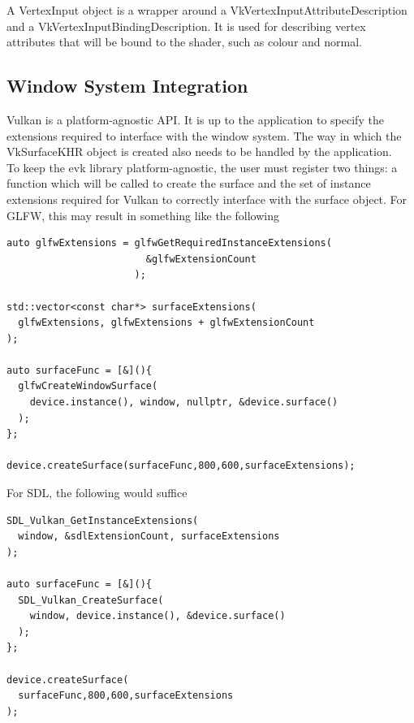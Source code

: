 \documentclass[12pt]{report}
\theoremstyle{definition}
\begin{document}
        A VertexInput object is a wrapper around a VkVertexInputAttributeDescription
        and a VkVertexInputBindingDescription. It is used for describing vertex
        attributes that will be bound to the shader, such as colour and normal.

      \subsection{Window System Integration}

        Vulkan is a platform-agnostic API. It is up to the application to
        specify the extensions required to interface with the window system.
        The way in which the VkSurfaceKHR object is created also needs to be
        handled by the application. \\

        To keep the evk library platform-agnostic, the user must register
        two things: a function which will be called to create the surface
        and the set of instance extensions required for Vulkan to correctly
        interface with the surface object. For GLFW, this may result in
        something like the following

        \begin{centering}
          \begin{Verbatim}[fontsize=\small]
auto glfwExtensions = glfwGetRequiredInstanceExtensions(
                        &glfwExtensionCount
                      );

std::vector<const char*> surfaceExtensions(
  glfwExtensions, glfwExtensions + glfwExtensionCount
);

auto surfaceFunc = [&](){
  glfwCreateWindowSurface(
    device.instance(), window, nullptr, &device.surface()
  );
};

device.createSurface(surfaceFunc,800,600,surfaceExtensions);
          \end{Verbatim}
        \end{centering}

        For SDL, the following would suffice

        \begin{centering}
          \begin{Verbatim}[fontsize=\small]
SDL_Vulkan_GetInstanceExtensions(
  window, &sdlExtensionCount, surfaceExtensions
);

auto surfaceFunc = [&](){
  SDL_Vulkan_CreateSurface(
    window, device.instance(), &device.surface()
  );
};

device.createSurface(
  surfaceFunc,800,600,surfaceExtensions
);
          \end{Verbatim}
        \end{centering}
\end{document}
